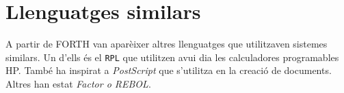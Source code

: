 \documentclass{article}
\begin{document}
\section{Llenguatges similars}
A partir de FORTH van aparèixer altres llenguatges que utilitzaven sistemes similars. Un d'ells és el \texttt{RPL} que utilitzen avui dia les calculadores programables HP. També ha inspirat a \emph{PostScript} que s'utilitza en la creació de documents. Altres han estat \emph{Factor o REBOL}.
\end{document}
